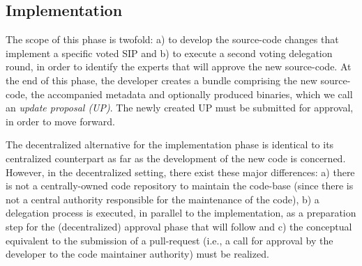 \subsection{Implementation}

The scope of this phase is twofold: a) to develop the source-code changes that implement a specific voted SIP and b) to execute a second voting delegation round, in order to identify the experts that will approve the new source-code. At the end of this phase, the developer creates a bundle comprising the new source-code, the accompanied metadata and optionally produced binaries, which we call an \emph{update proposal (UP)}. The newly created UP must be submitted for approval, in order to move forward.


The decentralized alternative for the implementation phase is identical to its centralized counterpart as far as the development of the new code is concerned. However, in the decentralized setting, there exist these major differences:
a) there is not a centrally-owned code repository to maintain the code-base (since there is not a central authority responsible for the maintenance of the code), b) a delegation process is executed, in parallel to the implementation, as a preparation step for the (decentralized) approval phase that will follow and c) the conceptual equivalent to the submission of a pull-request (i.e., a call for approval by the developer to the code maintainer authority) must be realized.

